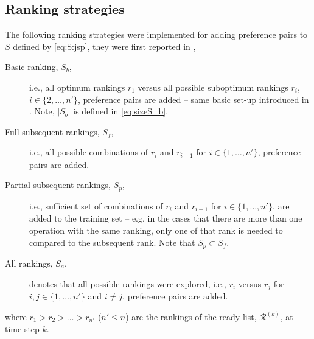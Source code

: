 \subsection{Ranking strategies}
The following ranking strategies were implemented for adding preference pairs 
to $S$ defined by \cref{eq:S:jsp}, they were first reported in \citet{InRu15a},
\begin{description}
\item[Basic ranking, $S_b$,] i.e., all optimum rankings $r_1$ versus all possible suboptimum rankings $r_i$, $i\in\{2,\ldots,n'\}$, preference pairs are added -- same basic set-up introduced in \cite{InRu11a}. Note, $|S_b|$ is defined in \cref{eq:sizeS_b}.
\item[Full subsequent rankings, $S_f$,] i.e., all possible combinations of $r_i$ and $r_{i+1}$ for $i\in\{1,\ldots,n'\}$, preference pairs are added.
\item[Partial subsequent rankings, $S_p$,] i.e., sufficient set of combinations of $r_i$ and $r_{i+1}$ for $i\in\{1,\ldots,n'\}$, are added to the training set -- e.g. in the cases that there are more than one operation with the same ranking, only one of that rank is needed to compared to the subsequent rank. Note that $S_p\subset S_f$.
\item[All rankings, $S_a$,] denotes that all possible rankings were explored, i.e.,
$r_i$ versus $r_j$ for $i,j\in\{1,\ldots,n'\}$ and $i\neq j$, preference pairs are added.
\end{description}
where $r_1>r_2>\ldots>r_{n'}$ ($n'\leq n$) are the rankings of the ready-list, $\mathcal{R}^{(k)}$, at time step $k$.


